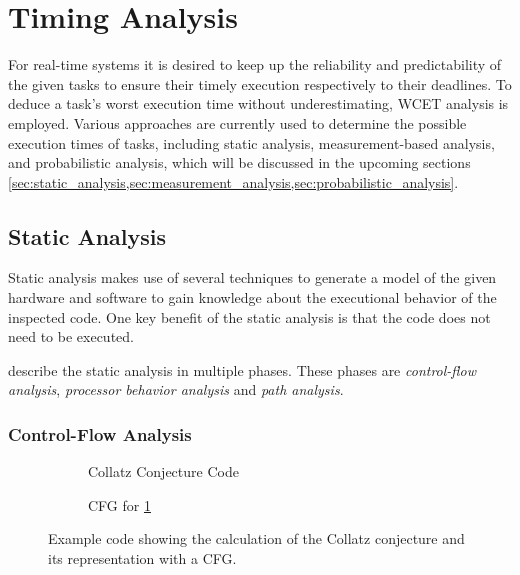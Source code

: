 \section{Timing Analysis}
\label{sec:timing_analysis}
For real-time systems it is desired to keep up the reliability and predictability of the given tasks to ensure their timely execution respectively to their deadlines.
To deduce a task's worst execution time without underestimating, \ac{WCET} analysis is employed.
Various approaches are currently used to determine the possible execution times of tasks, including static analysis, measurement-based analysis, and probabilistic analysis, which will be discussed in the upcoming sections \cref{sec:static_analysis,sec:measurement_analysis,sec:probabilistic_analysis}.

\subsection{Static Analysis}
\label{sec:static_analysis}
Static analysis makes use of several techniques to generate a model of the given hardware and software to gain knowledge about the executional behavior of the inspected code.
One key benefit of the static analysis is that the code does not need to be executed.

\textcite{wilhelmWorstcaseExecutiontimeProblem2008} describe the static analysis in multiple phases.
These phases are \textit{control-flow analysis}, \textit{processor behavior analysis} and \textit{path analysis}.

\subsubsection{Control-Flow Analysis}
\label{sec:cfa}

\begin{figure}[h]
	\begin{subfigure}[c]{0.45\textwidth}
		
		\caption{Collatz Conjecture Code}
		\label{fig:collatz_code}
	\end{subfigure}
	\hfill
	\begin{subfigure}[c]{0.45\textwidth}
		
		\caption{\ac{CFG} for \cref{fig:collatz_code}}
		\label{fig:cfg}
	\end{subfigure}
	\caption{Example code showing the calculation of the Collatz conjecture and its representation with a \acf{CFG}.}
	\label{fig:collatz_and_cfg}
\end{figure}

